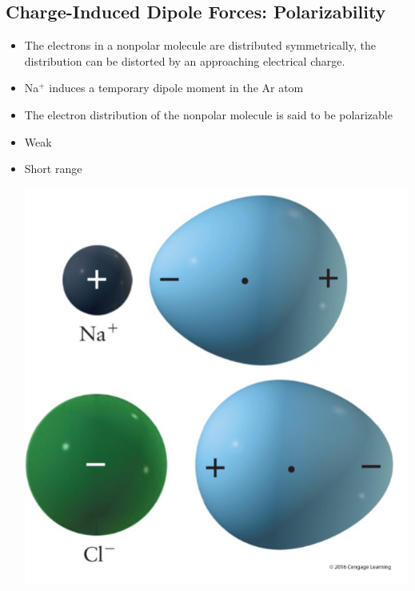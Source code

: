 \documentclass[10pt]{article}
\begin{document}
\subsection*{Charge-Induced Dipole Forces: Polarizability}
\begin{itemize}
    \item The electrons in a nonpolar molecule are distributed symmetrically, the distribution can be distorted by an approaching electrical charge.
    \item Na$^+$ induces a temporary dipole moment in the Ar atom
    \item The electron distribution of the nonpolar molecule is said to be polarizable
    \item Weak
    \item Short range
    \begin{center}
        \includegraphics[scale=0.5]{W2_8.png}
    \end{center}
\end{itemize}
\end{document}
